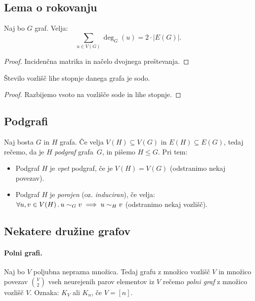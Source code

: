 \subsection{Lema o rokovanju}
\begin{lema}[o rokovanju]
    Naj bo $G$ graf. Velja: $$\sum_{u \in V(G)} \deg_G(u) = 2 \cdot |E(G)|.$$
\end{lema}

\begin{proof}
    Incidenčna matrika in načelo dvojnega preštevanja.
\end{proof}

\begin{posledica}
    Število vozlišč lihe stopnje danega grafa je sodo.
\end{posledica}

\begin{proof}
    Razbijemo vsoto na vozlišče sode in lihe stopnje.
\end{proof}

\subsection{Podgrafi}
\begin{definicija}
    Naj bosta $G$ in $H$ grafa. Če velja $V(H) \subseteq V(G)$ in $E(H) \subseteq E(G)$, tedaj rečemo, da je $H$ \emph{podgraf} grafa~$G$, in pišemo $H \leq G$. Pri tem:
    \begin{itemize}
        \item Podgraf $H$ je \emph{vpet} podgraf, če je $V(H) = V(G)$ (odstranimo nekaj povezav).
        \item Podgraf $H$ je \emph{porojen} (oz. \emph{induciran}), če velja:  $\forall u, v \in V(H) \,.\, u \sim_G v \implies u \sim_H v$ (odstranimo nekaj vozlišč).
    \end{itemize}
\end{definicija}

\newpage
\subsection{Nekatere družine grafov}
\paragraph{Polni grafi.} Naj bo $V$ poljubna neprazna množica. Tedaj grafu z množico vozlišč $V$ in množico povezav $\binom{V}{2}$ vseh neurejenih parov elementov iz $V$ rečemo \emph{polni graf} z množico vozlišč $V$. Oznaka: $K_V$ ali $K_n$, če $V = [n]$.

